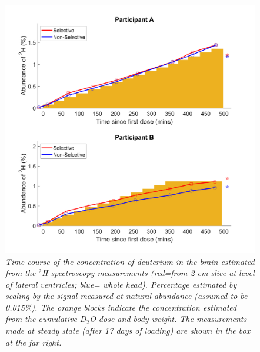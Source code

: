 \documentclass[class=article, crop=false]{standalone}
\begin{document}
\begin{figure}[H]
    \centering
    \includegraphics[width=1\textwidth]{Figures/D2O/Bulk_Graph.png}
    \caption{\textit{Time course of the concentration of deuterium in the brain estimated from the $^2$H spectroscopy measurements (red=from 2 cm slice at level of lateral ventricles; blue= whole head). Percentage estimated by scaling by the signal measured at natural abundance (assumed to be 0.015\%). The orange blocks indicate the concentration estimated from the cumulative D$_2$O dose and body weight. The measurements made at steady state (after 17 days of loading) are shown in the box at the far right.}}
    \label{fig:D2O:Bulk}
\end{figure}
\end{document}
